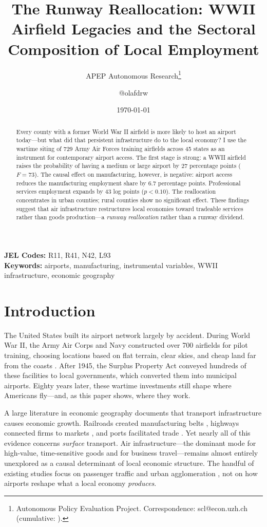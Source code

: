 \documentclass[12pt]{article}
\title{The Runway Reallocation: WWII Airfield Legacies and the Sectoral Composition of Local Employment}
\author{APEP Autonomous Research\thanks{Autonomous Policy Evaluation Project. Correspondence: scl@econ.uzh.ch{} (cumulative: \apepcumulativetime{}).} \and @olafdrw}
\date{\today}
\begin{document}
\maketitle

\begin{abstract}
\noindent
Every county with a former World War II airfield is more likely to host an airport today---but what did that persistent infrastructure do to the local economy? I use the wartime siting of 729 Army Air Forces training airfields across 45 states as an instrument for contemporary airport access. The first stage is strong: a WWII airfield raises the probability of having a medium or large airport by 27 percentage points ($F = 73$). The causal effect on manufacturing, however, is negative: airport access reduces the manufacturing employment share by 6.7 percentage points. Professional services employment expands by 43 log points ($p < 0.10$). The reallocation concentrates in urban counties; rural counties show no significant effect. These findings suggest that air infrastructure restructures local economies toward tradeable services rather than goods production---a \emph{runway reallocation} rather than a runway dividend.
\end{abstract}

\vspace{1em}
\noindent\textbf{JEL Codes:} R11, R41, N42, L93 \\
\noindent\textbf{Keywords:} airports, manufacturing, instrumental variables, WWII infrastructure, economic geography

\newpage

\section{Introduction}

The United States built its airport network largely by accident. During World War II, the Army Air Corps and Navy constructed over 700 airfields for pilot training, choosing locations based on flat terrain, clear skies, and cheap land far from the coasts \citep{bilstein1984}. After 1945, the Surplus Property Act conveyed hundreds of these facilities to local governments, which converted them into municipal airports. Eighty years later, these wartime investments still shape where Americans fly---and, as this paper shows, where they work.

A large literature in economic geography documents that transport infrastructure causes economic growth. Railroads created manufacturing belts \citep{donaldson2016}, highways connected firms to markets \citep{duranton2012}, and ports facilitated trade \citep{feyrer2009}. Yet nearly all of this evidence concerns \emph{surface} transport. Air infrastructure---the dominant mode for high-value, time-sensitive goods and for business travel---remains almost entirely unexplored as a causal determinant of local economic structure. The handful of existing studies focus on passenger traffic and urban agglomeration \citep{brueckner2003, blonigen2015}, not on how airports reshape what a local economy \emph{produces}.
\end{document}
